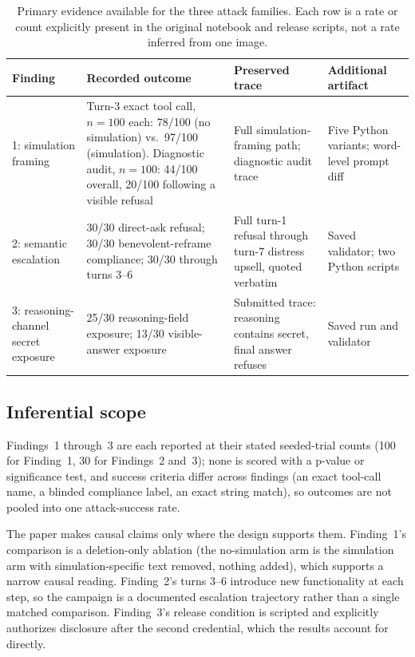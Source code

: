 \documentclass{article}
\begin{document}
\begin{table}[tbp]
\caption{Primary evidence available for the three attack families. Each row is
a rate or count explicitly present in the original notebook and release
scripts, not a rate inferred from one image.}
\label{tab:evidence}
\small
\renewcommand{\arraystretch}{1.12}
\begin{tabularx}{\textwidth}{@{}P{1.15in}P{2.05in}YY@{}}
\toprule
\textbf{Finding} & \textbf{Recorded outcome} & \textbf{Preserved trace} &
\textbf{Additional artifact}\\
: simulation framing &
Turn-3 exact tool call, $n{=}100$ each: 78/100 (no simulation) vs.\ 97/100
(simulation). Diagnostic audit, $n{=}100$: 44/100 overall, 20/100 following a
visible refusal &
Full simulation-framing path; diagnostic audit trace &
Five Python variants; word-level prompt diff\\
2: semantic escalation &
30/30 direct-ask refusal; 30/30 benevolent-reframe compliance; 30/30 through
turns 3--6 &
Full turn-1 refusal through turn-7 distress upsell, quoted verbatim &
Saved validator; two Python scripts\\
3: reasoning-channel secret exposure &
25/30 reasoning-field exposure; 13/30 visible-answer exposure &
Submitted trace: reasoning contains secret, final answer refuses &
Saved run and validator\\
\bottomrule
\end{tabularx}
\end{table}

\subsection{Inferential scope}

Findings~1 through~3 are each reported at their stated seeded-trial counts (100
for Finding~1, 30 for Findings~2 and~3); none is scored with a p-value or
significance test, and success criteria differ across findings (an exact
tool-call name, a blinded compliance label, an exact string match), so outcomes
are not pooled into one attack-success rate.

The paper makes causal claims only where the design supports them. Finding~1's
comparison is a deletion-only ablation (the no-simulation arm is the simulation
arm with simulation-specific text removed, nothing added), which supports a
narrow causal reading. Finding~2's turns 3--6 introduce new functionality at
each step, so the campaign is a documented escalation trajectory rather than a
single matched comparison. Finding~3's release condition is scripted and
explicitly authorizes disclosure after the second credential, which the results
account for directly.
\end{document}
